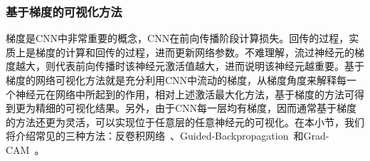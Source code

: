 \subsubsection*{基于梯度的可视化方法}
梯度是CNN中非常重要的概念，CNN在前向传播阶段计算损失。回传的过程，实质上是梯度的计算和回传的过程，进而更新网络参数。不难理解，流过神经元的梯度越大，则代表前向传播时该神经元激活值越大，进而说明该神经元越重要。基于梯度的网络可视化方法就是充分利用CNN中流动的梯度，从梯度角度来解释每一个神经元在网络中所起到的作用，相对上述激活最大化方法，基于梯度的方法可得到更为精细的可视化结果。另外，由于CNN每一层均有梯度，因而通常基于梯度的方法还更为灵活，可以实现位于任意层的任意神经元的可视化。在本小节，我们将介绍常见的三种方法：反卷积网络~\cite{zeiler2010deconvolutional}、Guided-Backpropagation~\cite{springenberg2014striving}和Grad-CAM~\cite{selvaraju2017grad}。

